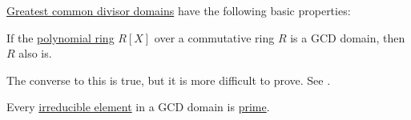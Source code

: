 \begin{proposition}\label{thm:def:gcd_domain}
  \hyperref[def:gcd_domain]{Greatest common divisor domains} have the following basic properties:
  \begin{thmenum}
     If the \hyperref[def:polynomial_algebra]{polynomial ring} \( R[X] \) over a commutative ring \( R \) is a GCD domain, then \( R \) also is.

    The converse to this is true, but it is more difficult to prove. See .

     Every \hyperref[def:domain_divisibility/irreducible]{irreducible element} in a GCD domain is \hyperref[def:domain_divisibility/prime]{prime}.
  \end{thmenum}
\end{proposition}
